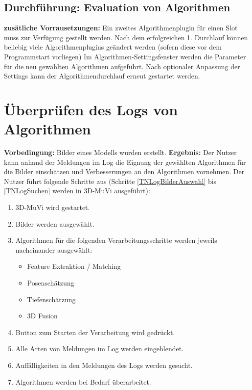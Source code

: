 \subsection{Durchführung: Evaluation von Algorithmen}
\textbf{zusätliche Vorrausetzungen:} Ein zweites Algorithmenplugin für einen Slot muss zur Verfügung gestellt werden.\newline
Nach dem erfolgreichen 1. Durchlauf können beliebig viele Algorithmenplugins geändert werden (sofern diese vor dem Programmstart vorliegen)
Im Algorithmen-Settingsfenster werden die Parameter für die neu gewählten Algorithmen aufgeführt.
Nach optionaler Anpassung der Settings kann der Algorithmendurchlauf erneut gestartet werden.

\section{Überprüfen des Logs von Algorithmen}
\textbf{Vorbedingung:} Bilder eines Modells wurden erstellt. \newline
\textbf{Ergebnis:} Der Nutzer kann anhand der Meldungen im Log die Eignung der gewählten Algorithmen für die Bilder einschätzen und Verbesserungen an den Algorithmen vornehmen. \newline
Der Nutzer führt folgende Schritte aus (Schritte \ref{TNLogBilderAuswahl} bis \ref{TNLogSuchen} werden in 3D-MuVi ausgeführt):
\begin{enumerate}
	\item 3D-MuVi wird gestartet.
	\item \label{TNLogBilderAuswahl} Bilder werden ausgewählt.
	\item Algorithmen für die folgenden Verarbeitungsschritte werden jeweils nacheinander ausgewählt:
	\begin{itemize}
		\item Feature Extraktion / Matching
		\item Posenschätzung
		\item Tiefenschätzung
		\item 3D Fusion
	\end{itemize}
	\item Button zum Starten der Verarbeitung wird gedrückt.
	\item Alle Arten von Meldungen im Log werden eingeblendet.
	\item \label{TNLogSuchen} Auffälligkeiten in den Meldungen des Logs werden gesucht.
	\item Algorithmen werden bei Bedarf überarbeitet.
\end{enumerate}
